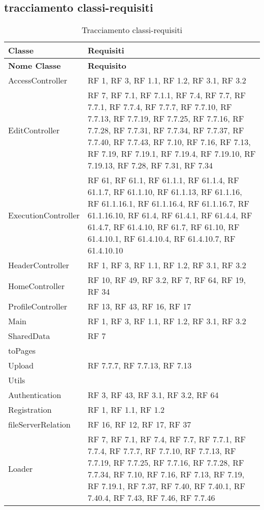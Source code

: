 \subsection{tracciamento classi-requisiti}{
\begin{center}
\renewcommand*{\arraystretch}{1.4} 
\begin{longtable} [c]{| p{7cm} | p{6cm} |} 
\caption{Tracciamento classi-requisiti \label{tab:traccClRq}}\\ \hline\textbf{Classe} & \textbf {Requisiti} \\ 
\hline \endfirsthead \hline 
\textbf{Nome Classe} & \textbf{Requisito} \\ 
\hline \endhead \hline \endfoot \hline \endlastfoot 
AccessController & RF 1, RF 3, RF 1.1, RF 1.2, RF 3.1, RF 3.2\\ 
 \hline 
EditController & RF 7, RF 7.1, RF 7.1.1, RF 7.4, RF 7.7, RF 7.7.1, RF 7.7.4, RF 7.7.7, RF 7.7.10, RF 7.7.13, RF 7.7.19, RF 7.7.25, RF 7.7.16, RF 7.7.28, RF 7.7.31, RF 7.7.34, RF 7.7.37, RF 7.7.40, RF 7.7.43, RF 7.10, RF 7.16, RF 7.13, RF 7.19, RF 7.19.1, RF 7.19.4, RF 7.19.10, RF 7.19.13, RF 7.28, RF 7.31, RF 7.34\\ 
 \hline 
ExecutionController & RF 61, RF 61.1, RF 61.1.1, RF 61.1.4, RF 61.1.7, RF 61.1.10, RF 61.1.13, RF 61.1.16, RF 61.1.16.1, RF 61.1.16.4, RF 61.1.16.7, RF 61.1.16.10, RF 61.4, RF 61.4.1, RF 61.4.4, RF 61.4.7, RF 61.4.10, RF 61.7, RF 61.10, RF 61.4.10.1, RF 61.4.10.4, RF 61.4.10.7, RF 61.4.10.10\\ 
 \hline 
HeaderController & RF 1, RF 3, RF 1.1, RF 1.2, RF 3.1, RF 3.2\\ 
 \hline 
HomeController & RF 10, RF 49, RF 3.2, RF 7, RF 64, RF 19, RF 34\\ 
 \hline 
ProfileController & RF 13, RF 43, RF 16, RF 17\\ 
 \hline 
Main & RF 1, RF 3, RF 1.1, RF 1.2, RF 3.1, RF 3.2\\ 
 \hline 
SharedData & RF 7\\ 
 \hline 
toPages & \\ 
 \hline 
Upload & RF 7.7.7, RF 7.7.13, RF 7.13\\ 
 \hline 
Utils & \\
 \hline 
Authentication & RF 3, RF 43, RF 3.1, RF 3.2, RF 64\\ 
 \hline 
Registration & RF 1, RF 1.1, RF 1.2\\ 
 \hline 
fileServerRelation & RF 16, RF 12, RF 17, RF 37\\ 
 \hline 
Loader & RF 7, RF 7.1, RF 7.4, RF 7.7, RF 7.7.1, RF 7.7.4, RF 7.7.7, RF 7.7.10, RF 7.7.13, RF 7.7.19, RF 7.7.25, RF 7.7.16, RF 7.7.28, RF 7.7.34, RF 7.10, RF 7.16, RF 7.13, RF 7.19, RF 7.19.1, RF 7.37, RF 7.40, RF 7.40.1, RF 7.40.4, RF 7.43, RF 7.46, RF 7.7.46\\ 

\end{longtable}
\end{center}}
